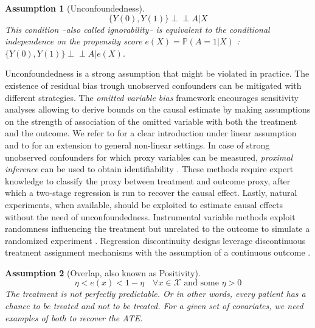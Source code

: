 \documentclass[10pt,letterpaper]{article}
\newcommand{\indep}{\perp \!\!\! \perp}
\newtheorem{assumption}{Assumption}
\begin{document}
\begin{assumption}[Unconfoundedness]\label{assumption:ignorability}
  \begin{equation}\label{eq:ignorability}
    \{Y(0), Y(1) \} \indep A | X
  \end{equation}
  This condition --also called ignorability-- is equivalent to the conditional
  independence on the propensity score $e(X)=\mathbb P(A=1|X)$ \cite{rosenbaum1983central}: $\{Y(0), Y(1) \}\indep  A | e(X)$.
\end{assumption}

Unconfoundedness is a strong assumption that might be violated in practice. The
existence of residual bias trough unobserved confounders can be mitigated with
different strategies. The \textit{omitted variable bias} framework encourages
sensitivity analyses allowing to derive bounds on the causal estimate by making
assumptions on the strength of association of the omitted variable with both the
treatment and the outcome. We refer to \cite{cinelli2020making} for a clear
introduction under linear assumption and to \cite{chernozhukov2022long} for an
extension to general non-linear settings. In case of strong unobserved
confounders for which proxy variables can be measured, \textit{proximal
  inference} can be used to obtain identifiability
\cite{tchetgen2024introduction}. These methods require expert knowledge to
classify the proxy between treatment and outcome proxy, after which a two-stage
regression is run to recover the causal effect. Lastly, natural experiments, when
available, should be exploited to estimate causal effects without the need of
unconfoundedness. Instrumental variable methods exploit randomness influencing
the treatment but unrelated to the outcome to simulate a randomized experiment
\cite[chapter 9]{wager2020stats}. Regression discontinuity designs leverage
discontinuous treatment assignment mechanisms with the assumption of a
continuous outcome \cite[chapter 5]{wager2020stats}.

\begin{assumption}[Overlap, also known as Positivity]\label{assumption:overlap}
  \begin{equation}\label{eq:overlap}
    \eta < e(x) < 1 - \eta \quad \forall x \in \mathcal{X} \text{ and some }   \eta > 0
  \end{equation}
  The treatment is not perfectly predictable. Or in other words, every
  patient has a chance to be treated and not to be treated. For a given set of
  covariates, we need examples of both to recover the ATE.
\end{assumption}
\end{document}
